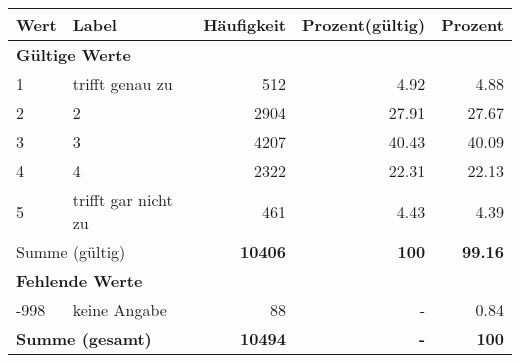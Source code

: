      \begin{longtable}{lXrrr}
     \toprule
     \textbf{Wert} & \textbf{Label} & \textbf{Häufigkeit} & \textbf{Prozent(gültig)} & \textbf{Prozent} \\
     \endhead
     \midrule
     \multicolumn{5}{l}{\textbf{Gültige Werte}}\\

     1 &
     \multicolumn{1}{X}{ trifft genau zu   } &


       \num{512} &
       \num[round-mode=places,round-precision=2]{4.92} &
         \num[round-mode=places,round-precision=2]{4.88} \\

     2 &
     \multicolumn{1}{X}{ 2   } &


       \num{2904} &
       \num[round-mode=places,round-precision=2]{27.91} &
         \num[round-mode=places,round-precision=2]{27.67} \\

     3 &
     \multicolumn{1}{X}{ 3   } &


       \num{4207} &
       \num[round-mode=places,round-precision=2]{40.43} &
         \num[round-mode=places,round-precision=2]{40.09} \\

     4 &
     \multicolumn{1}{X}{ 4   } &


       \num{2322} &
       \num[round-mode=places,round-precision=2]{22.31} &
         \num[round-mode=places,round-precision=2]{22.13} \\

     5 &
     \multicolumn{1}{X}{ trifft gar nicht zu   } &


       \num{461} &
       \num[round-mode=places,round-precision=2]{4.43} &
         \num[round-mode=places,round-precision=2]{4.39} \\
     \midrule
     \multicolumn{2}{l}{Summe (gültig)} &
       \textbf{\num{10406}} &
     \textbf{\num{100}} &
       \textbf{\num[round-mode=places,round-precision=2]{99.16}} \\
     \multicolumn{5}{l}{\textbf{Fehlende Werte}}\\
       -998 &
       keine Angabe &
         \num{88} &
        - &
         \num[round-mode=places,round-precision=2]{0.84} \\
     \midrule
     \multicolumn{2}{l}{\textbf{Summe (gesamt)}} &
          \textbf{\num{10494}} &
        \textbf{-} &
        \textbf{\num{100}} \\
     \bottomrule
     \end{longtable}
     
